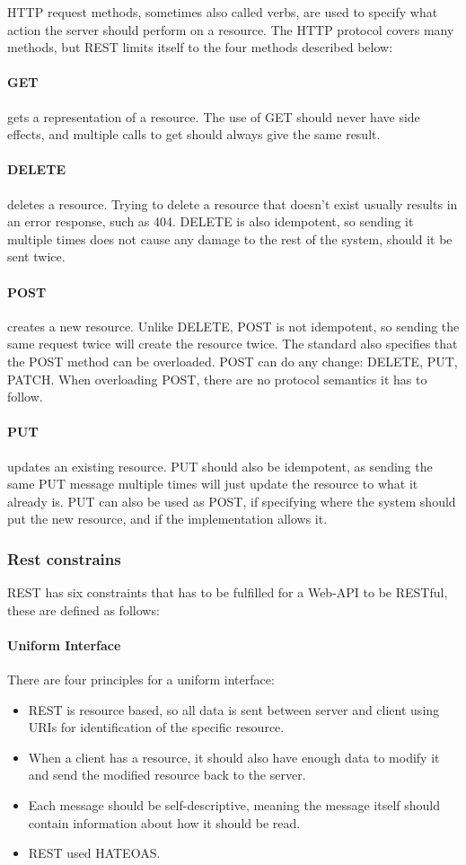 HTTP request methods, sometimes also called verbs, are used to specify what action the server should perform on a resource. The HTTP protocol covers many methods, but REST limits itself to the four methods described below:

\paragraph{GET} gets a representation of a resource. The use of GET should never have side effects, and multiple calls to get should always give the same result.
\paragraph{DELETE} deletes a resource. Trying to delete a resource that doesn't exist usually results in an error response, such as 404. DELETE is also idempotent, so sending it multiple times does not cause any damage to the rest of the system, should it be sent twice.
\paragraph{POST} creates a new resource. Unlike DELETE, POST is not idempotent, so sending the same request twice will create the resource twice. 
The standard also specifies that the POST method can be overloaded. POST can do any change: DELETE, PUT, PATCH. When overloading POST, there are no protocol semantics it has to follow.
\paragraph{PUT} updates an existing resource. PUT should also be idempotent, as sending the same PUT message multiple times will just update the resource to what it already is. PUT can also be used as POST, if specifying where the system should put the new resource, and if the implementation allows it.

\subsubsection{Rest constrains}
REST has six constraints that has to be fulfilled for a Web-API to be RESTful, these are defined as follows:

\paragraph{Uniform Interface}  There are four principles for a uniform interface:
\begin{itemize}
\item REST is resource based, so all data is sent between server and client using URIs for identification of the specific resource.
\item When a client has a resource, it should also have enough data to modify it and send the modified resource back to the server.
\item Each message should be self-descriptive, meaning the message itself should contain information about how it should be read.
\item REST used HATEOAS.
\end{itemize}

